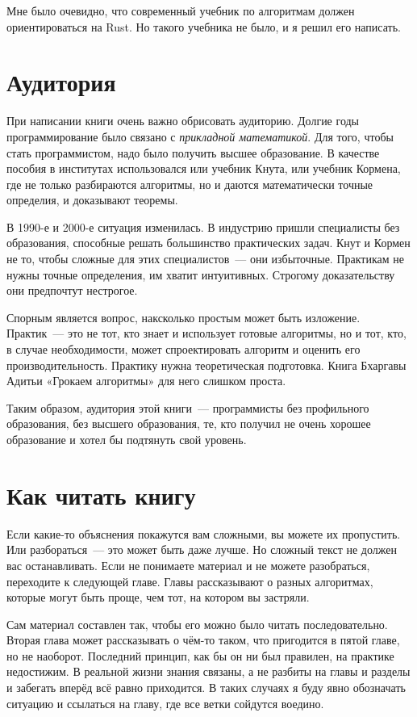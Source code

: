 Мне было очевидно, что современный учебник по алгоритмам должен ориентироваться на Rust.
Но такого учебника не было, и я решил его написать.

\section{Аудитория}

При написании книги очень важно обрисовать аудиторию.
Долгие годы программирование было связано с {\em прикладной математикой}.
Для того, чтобы стать программистом, надо было получить высшее образование.
В качестве пособия в институтах использовался или учебник Кнута, или учебник Кормена, где не только разбираются алгоритмы, но и даются математически точные определия, и доказывают теоремы.

В 1990-е и 2000-е ситуация изменилась.
В индустрию пришли специалисты без образования, способные решать большинство практических задач.
Кнут и Кормен не то, чтобы сложные для этих специалистов~--- они избыточные.
Практикам не нужны точные определения, им хватит интуитивных.
Строгому доказательству они предпочтут нестрогое.

Спорным является вопрос, наксколько простым может быть изложение.
Практик~--- это не тот, кто знает и использует готовые алгоритмы, но и тот, кто, в случае необходимости, может спроектировать алгоритм и оценить его производительность.
Практику нужна теоретическая подготовка. Книга Бхаргавы Адитьи «Грокаем алгоритмы» для него слишком проста.

Таким образом, аудитория этой книги~--- программисты без профильного образования, без высшего образования, те, кто получил не очень хорошее образование и хотел бы подтянуть свой уровень.

\section{Как читать книгу}

Если какие-то объяснения покажутся вам сложными, вы можете их пропустить.
Или разбораться~--- это может быть даже лучше.
Но сложный текст не должен вас останавливать.
Если не понимаете материал и не можете разобраться, переходите к следующей главе.
Главы рассказывают о разных алгоритмах, которые могут быть проще, чем тот, на котором вы застряли.

Сам материал составлен так, чтобы его можно было читать последовательно.
Вторая глава может рассказывать о чём-то таком, что пригодится в пятой главе, но не наоборот.
Последний принцип, как бы он ни был правилен, на практике недостижим.
В реальной жизни знания связаны, а не разбиты на главы и разделы и забегать вперёд всё равно приходится.
В таких случаях я буду явно обозначать ситуацию и ссылаться на главу, где все ветки сойдутся воедино.

